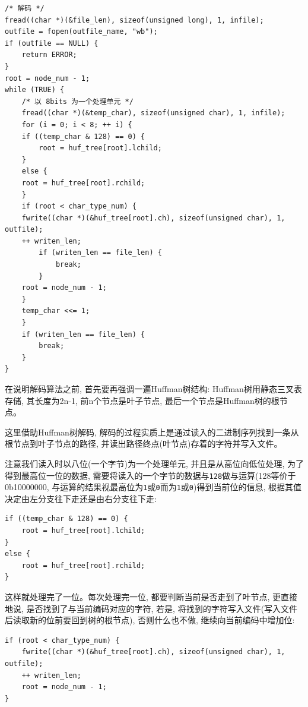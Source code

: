 \documentclass{ctexart}
\begin{document}
{\setmainfont{Courier New Bold}              
\begin{lstlisting}
/* 解码 */
fread((char *)(&file_len), sizeof(unsigned long), 1, infile);
outfile = fopen(outfile_name, "wb");
if (outfile == NULL) {
    return ERROR;
}
root = node_num - 1;
while (TRUE) {
    /* 以 8bits 为一个处理单元 */
    fread((char *)(&temp_char), sizeof(unsigned char), 1, infile);
    for (i = 0; i < 8; ++ i) {
    if ((temp_char & 128) == 0) {
        root = huf_tree[root].lchild;
    }
    else {
    root = huf_tree[root].rchild;
    }
    if (root < char_type_num) {
    fwrite((char *)(&huf_tree[root].ch), sizeof(unsigned char), 1, outfile);
    ++ writen_len;
        if (writen_len == file_len) {
            break;
        }
    root = node_num - 1;
    }
    temp_char <<= 1;
    }
    if (writen_len == file_len) {
        break;
    }
}
\end{lstlisting}}

在说明解码算法之前, 首先要再强调一遍Huffman树结构: Huffman树用静态三叉表存储, 其长度为2n-1, 前n个节点是叶子节点, 最后一个节点是Huffman树的根节点。

这里借助Huffman树解码, 解码的过程实质上是通过读入的二进制序列找到一条从根节点到叶子节点的路径,
并读出路径终点(叶节点)存着的字符并写入文件。

注意我们读入时以八位(一个字节)为一个处理单元, 并且是从高位向低位处理, 为了得到最高位一位的数据,
需要将读入的一个字节的数据与\texttt{128}做与运算(128等价于0b10000000, 与运算的结果视最高位为\texttt{1}或\texttt{0}而为\texttt{1}或\texttt{0})得到当前位的信息, 根据其值决定由左分支往下走还是由右分支往下走:

{\setmainfont{Courier New Bold}              
\begin{lstlisting}
if ((temp_char & 128) == 0) {
    root = huf_tree[root].lchild;
}
else {
    root = huf_tree[root].rchild;
}
\end{lstlisting}}

这样就处理完了一位。每次处理完一位, 都要判断当前是否走到了叶节点, 更直接地说, 是否找到了与当前编码对应的字符, 若是, 将找到的字符写入文件(写入文件后读取新的位前要回到树的根节点), 否则什么也不做, 继续向当前编码中增加位:

{\setmainfont{Courier New Bold}              
\begin{lstlisting}
if (root < char_type_num) {
    fwrite((char *)(&huf_tree[root].ch), sizeof(unsigned char), 1, outfile);
    ++ writen_len;
    root = node_num - 1;
}
\end{lstlisting}}
\end{document}
